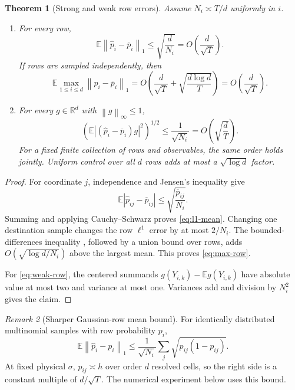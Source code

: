 \documentclass[11pt]{article}
\newtheorem{theorem}{Theorem}[section]
\theoremstyle{definition}
\theoremstyle{remark}
\newtheorem{remark}[theorem]{Remark}
\newcommand{\R}{\mathbb R}
\newcommand{\E}{\mathbb E}
\newcommand{\norm}[1]{\left\lVert #1\right\rVert}
\begin{document}
\begin{theorem}[Strong and weak row errors]\label{thm:sampling}
Assume $N_i\asymp T/d$ uniformly in $i$.
\begin{enumerate}[label=(\roman*),leftmargin=2.2em]
  \item For every row,
  \begin{equation}\label{eq:l1-mean}
    \E\norm{\widehat p_i-\overline p_i}_1
    \le\sqrt{\frac d{N_i}}
    =O\left(\frac d{\sqrt T}\right).
  \end{equation}
  If rows are sampled independently, then
  \begin{equation}\label{eq:max-row}
    \E\max_{1\le i\le d}\norm{\widehat p_i-\overline p_i}_1
    =
    O\left(
      \frac d{\sqrt T}
      +\sqrt{\frac{d\log d}{T}}
    \right)
    =O\left(\frac d{\sqrt T}\right).
  \end{equation}
  \item For every $g\in\R^d$ with $\norm{g}_\infty\le1$,
  \begin{equation}\label{eq:weak-row}
    \left(
      \E\left|
        (\widehat p_i-\overline p_i)g
      \right|^2
    \right)^{1/2}
    \le\frac1{\sqrt{N_i}}
    =O\left(\sqrt{\frac dT}\right).
  \end{equation}
  For a fixed finite collection of rows and observables, the same order holds
  jointly.  Uniform control over all $d$ rows adds at most a
  $\sqrt{\log d}$ factor.
\end{enumerate}
\end{theorem}

\begin{proof}
For coordinate $j$, independence and Jensen's inequality give
\[
  \E|\widehat p_{ij}-\overline p_{ij}|
  \le
  \sqrt{\frac{\overline p_{ij}}{N_i}}.
\]
Summing and applying Cauchy--Schwarz proves
\eqref{eq:l1-mean}.  Changing one destination sample changes the row
$\ell^1$ error by at most $2/N_i$.  The bounded-differences inequality
\citep{McDiarmid1989}, followed by a union bound over rows, adds
$O(\sqrt{\log d/N_i})$ above the largest mean.  This proves
\eqref{eq:max-row}.

For \eqref{eq:weak-row}, the centered summands
$g(Y_{i,k})-\E g(Y_{i,k})$ have absolute value at most two and variance at
most one.  Variances add and division by $N_i^2$ gives the claim.
\end{proof}

\begin{remark}[Sharper Gaussian-row mean bound]\label{rem:sharp-l1}
For identically distributed multinomial samples with row probability $p_i$,
\[
  \E\norm{\widehat p_i-p_i}_1
  \le
  \frac1{\sqrt{N_i}}\sum_j\sqrt{p_{ij}(1-p_{ij})}.
\]
At fixed physical $\sigma$, $p_{ij}\asymp h$ over order $d$ resolved cells,
so the right side is a constant multiple of $d/\sqrt T$.  The numerical
experiment below uses this bound.
\end{remark}
\end{document}
